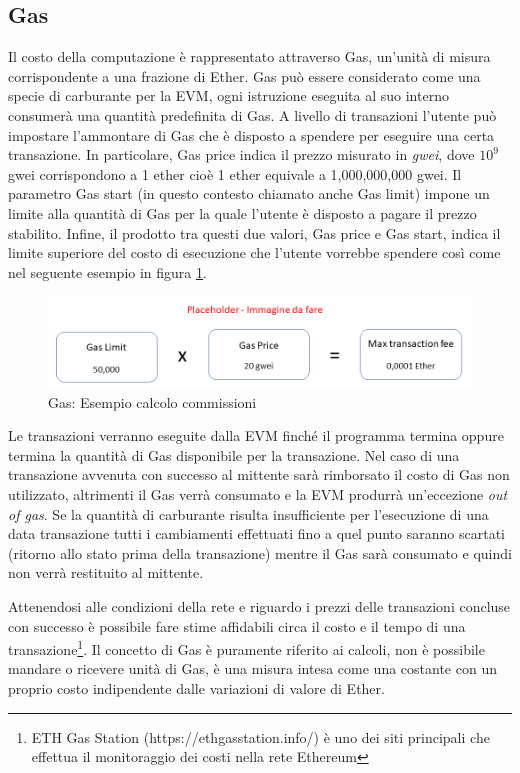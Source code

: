 \subsection{Gas}

Il costo della computazione è rappresentato attraverso Gas, un’unità di misura corrispondente a una frazione di Ether. Gas può essere considerato come una specie di carburante per la EVM, ogni istruzione eseguita al suo interno consumerà una quantità predefinita di Gas. A livello di transazioni l’utente può impostare l’ammontare di Gas che è disposto a spendere per eseguire una certa transazione. In particolare, Gas price indica il prezzo misurato in \emph{gwei}, dove \(10^{9}\) gwei corrispondono a 1 ether cioè 1 ether equivale a 1,000,000,000 gwei. Il parametro Gas start (in questo contesto chiamato anche Gas limit) impone un limite alla quantità di Gas per la quale l’utente è disposto a pagare il prezzo stabilito.
Infine, il prodotto tra questi due valori, Gas price e Gas start, indica il limite superiore del costo di esecuzione che l’utente vorrebbe spendere così come nel seguente esempio in figura \ref{fig:GasEth}.

\begin{figure}[H]
\centering
\includegraphics[width=1\textwidth]{immagini/gas.png}
\caption{Gas: Esempio calcolo commissioni}
\label{fig:GasEth}
\end{figure}

Le transazioni verranno eseguite dalla EVM finché il programma termina oppure termina la quantità di Gas disponibile per la transazione. Nel caso di una transazione avvenuta con successo al mittente sarà rimborsato il costo di Gas non utilizzato, altrimenti il Gas verrà consumato e la EVM produrrà un'eccezione \emph{out of gas}. Se la quantità di carburante risulta insufficiente per l'esecuzione di una data transazione tutti i cambiamenti effettuati fino a quel punto saranno scartati (ritorno allo stato prima della transazione) mentre il Gas sarà consumato e quindi non verrà restituito al mittente.

Attenendosi alle condizioni della rete e riguardo i prezzi delle transazioni concluse con successo è possibile fare stime affidabili circa il costo e il tempo di una transazione\footnote{ETH Gas Station (https://ethgasstation.info/) è uno dei siti principali che effettua il monitoraggio dei costi nella rete Ethereum}. Il concetto di Gas è puramente riferito ai calcoli, non è possibile mandare o ricevere unità di Gas, è una misura intesa come una costante con un proprio costo indipendente dalle variazioni di valore di Ether.


